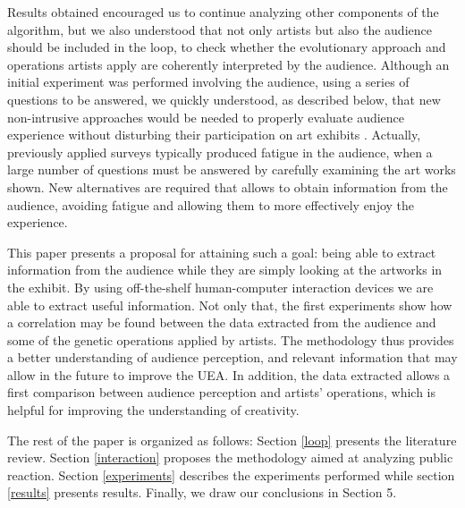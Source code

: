 \documentclass[graybox]{svmult}
\begin{document}
Results obtained encouraged us to continue analyzing other components
of the algorithm, but we also understood that not only artists but
also the audience should be included in the loop, to check whether the
evolutionary approach and operations artists apply are coherently
interpreted by the audience.  Although an initial experiment was
performed involving the audience, using a series of questions to be
answered, we quickly understood, as described below, that new
non-intrusive approaches would be needed to properly evaluate audience
experience without disturbing their participation on art exhibits \cite{chou2007museum}.
Actually, previously applied surveys typically produced fatigue in the
audience, when a large number of questions must be answered by
carefully examining the art works shown.  New alternatives are
required that allows to obtain information from the audience, avoiding
fatigue and allowing them to more effectively enjoy the experience. 

This paper presents a proposal for attaining such a goal:  being able
to extract information from the audience while they are simply looking
at the artworks in the exhibit.  By using off-the-shelf human-computer
interaction devices we are able to extract useful information. %
Not
only that, the first experiments show how a correlation may be found
between the data extracted from the audience and some of the genetic
operations applied by artists.  The methodology thus provides a better
understanding of audience perception, and relevant information that
may allow in the future to improve the UEA.  In addition, the data
extracted allows a first comparison between audience perception and
artists' operations, which is helpful for improving the understanding
of creativity. 

The rest of the paper is organized as follows: Section \ref{loop} presents the literature review. Section \ref{interaction} proposes the methodology aimed at analyzing public reaction. Section \ref{experiments} describes the experiments performed while section \ref{results} presents results.  Finally, we draw our conclusions in Section 5. %
\end{document}
